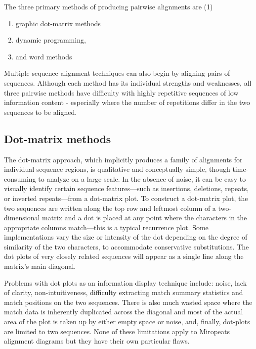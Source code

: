 \documentclass[
]{book}
\providecommand{\tightlist}{%
  \setlength{\itemsep}{0pt}\setlength{\parskip}{0pt}}
\begin{document}
The three primary methods of producing pairwise alignments are (1)

\begin{enumerate}
\def\labelenumi{\arabic{enumi}.}
\tightlist
\item
  graphic dot-matrix methods
\item
  dynamic programming,
\item
  and word methods
\end{enumerate}

Multiple sequence alignment techniques can also begin by aligning pairs of sequences. Although each method has its individual strengths and weaknesses, all three pairwise methods have difficulty with highly repetitive sequences of low information content - especially where the number of repetitions differ in the two sequences to be aligned.

\hypertarget{dot-matrix-methods}{%
\subsection{Dot-matrix methods}\label{dot-matrix-methods}}

The dot-matrix approach, which implicitly produces a family of alignments for individual sequence regions, is qualitative and conceptually simple, though time-consuming to analyze on a large scale. In the absence of noise, it can be easy to visually identify certain sequence features---such as insertions, deletions, repeats, or inverted repeats---from a dot-matrix plot. To construct a dot-matrix plot, the two sequences are written along the top row and leftmost column of a two-dimensional matrix and a dot is placed at any point where the characters in the appropriate columns match---this is a typical recurrence plot. Some implementations vary the size or intensity of the dot depending on the degree of similarity of the two characters, to accommodate conservative substitutions. The dot plots of very closely related sequences will appear as a single line along the matrix's main diagonal.

Problems with dot plots as an information display technique include: noise, lack of clarity, non-intuitiveness, difficulty extracting match summary statistics and match positions on the two sequences. There is also much wasted space where the match data is inherently duplicated across the diagonal and most of the actual area of the plot is taken up by either empty space or noise, and, finally, dot-plots are limited to two sequences. None of these limitations apply to Miropeats alignment diagrams but they have their own particular flaws.
\end{document}

